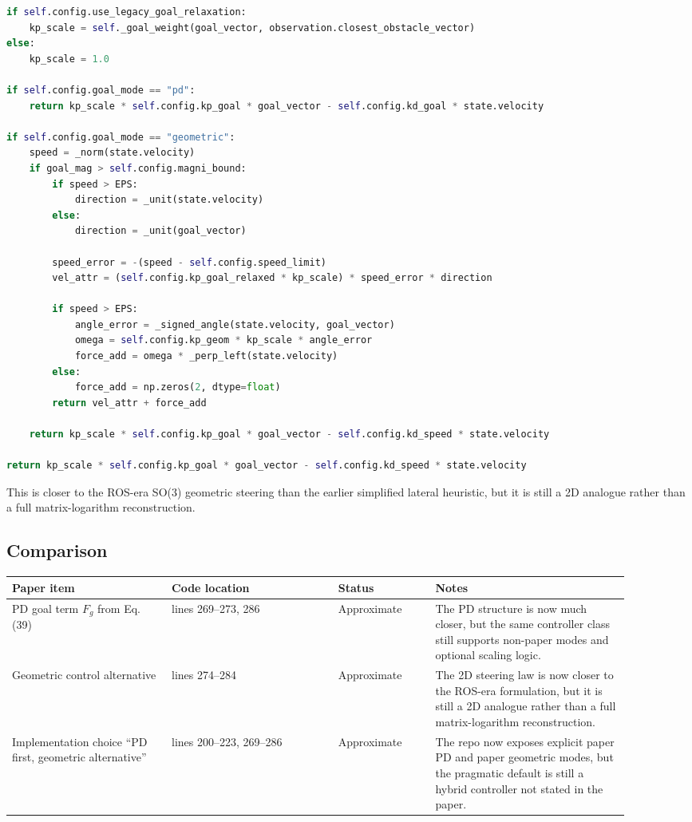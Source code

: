 \documentclass[11pt]{article}
\begin{document}
\begin{lstlisting}[language=Python]
if self.config.use_legacy_goal_relaxation:
    kp_scale = self._goal_weight(goal_vector, observation.closest_obstacle_vector)
else:
    kp_scale = 1.0

if self.config.goal_mode == "pd":
    return kp_scale * self.config.kp_goal * goal_vector - self.config.kd_goal * state.velocity

if self.config.goal_mode == "geometric":
    speed = _norm(state.velocity)
    if goal_mag > self.config.magni_bound:
        if speed > EPS:
            direction = _unit(state.velocity)
        else:
            direction = _unit(goal_vector)

        speed_error = -(speed - self.config.speed_limit)
        vel_attr = (self.config.kp_goal_relaxed * kp_scale) * speed_error * direction

        if speed > EPS:
            angle_error = _signed_angle(state.velocity, goal_vector)
            omega = self.config.kp_geom * kp_scale * angle_error
            force_add = omega * _perp_left(state.velocity)
        else:
            force_add = np.zeros(2, dtype=float)
        return vel_attr + force_add

    return kp_scale * self.config.kp_goal * goal_vector - self.config.kd_speed * state.velocity

return kp_scale * self.config.kp_goal * goal_vector - self.config.kd_speed * state.velocity
\end{lstlisting}

This is closer to the ROS-era SO(3) geometric steering than the earlier
simplified lateral heuristic, but it is still a 2D analogue rather than a full
matrix-logarithm reconstruction.

\subsection*{Comparison}

\begin{longtable}{|p{0.23\linewidth}|p{0.24\linewidth}|p{0.14\linewidth}|p{0.29\linewidth}|}
\hline
\textbf{Paper item} & \textbf{Code location} & \textbf{Status} & \textbf{Notes} \\
\hline
PD goal term \(F_g\) from Eq. (39) & lines 269--273, 286 & Approximate & The PD structure is now much closer, but the same controller class still supports non-paper modes and optional scaling logic. \\
\hline
Geometric control alternative & lines 274--284 & Approximate & The 2D steering law is now closer to the ROS-era formulation, but it is still a 2D analogue rather than a full matrix-logarithm reconstruction. \\
\hline
Implementation choice ``PD first, geometric alternative'' & lines 200--223, 269--286 & Approximate & The repo now exposes explicit paper PD and paper geometric modes, but the pragmatic default is still a hybrid controller not stated in the paper. \\
\hline
\end{longtable}
\end{document}
